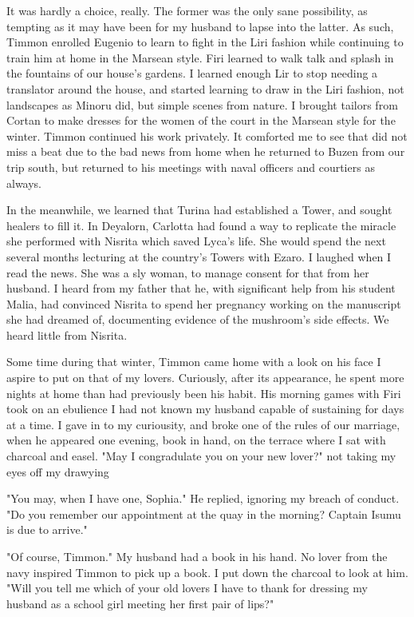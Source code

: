 \documentclass{article}
\begin{document}
It was hardly a choice, really. The former was the only sane possibility, as tempting as it may have been for my husband to lapse into the latter. As such, Timmon enrolled Eugenio to learn to fight in the Liri fashion while continuing to train him at home in the Marsean style. Firi learned to walk talk and splash in the fountains of our house's gardens. I learned enough Lir to stop needing a translator around the house, and started learning to draw in the Liri fashion, not landscapes as Minoru did, but simple scenes from nature. I brought tailors from Cortan to make dresses for the women of the court in the Marsean style for the winter. Timmon continued his work privately. It comforted me to see that did not miss a beat due to the bad news from home when he returned to Buzen from our trip south, but returned to his meetings with naval officers and courtiers as always. 

In the meanwhile, we learned that Turina had established a Tower, and sought healers to fill it. In Deyalorn, Carlotta had found a way to replicate the miracle she performed with Nisrita which saved Lyca's life. She would spend the next several months lecturing at the country's Towers with Ezaro. I laughed when I read the news. She was a sly woman, to manage consent for that from her husband. I heard from my father that he, with significant help from his student Malia, had convinced Nisrita to spend her pregnancy working on the manuscript she had dreamed of, documenting evidence of the mushroom's side effects. We heard little from Nisrita. 

Some time during that winter, Timmon came home with a look on his face I aspire to put on that of my lovers. Curiously, after its appearance, he spent more nights at home than had previously been his habit. His morning games with Firi took on an ebulience I had not known my husband capable of sustaining for days at a time. I gave in to my curiousity, and broke one of the rules of our marriage, when he appeared one evening, book in hand, on the terrace where I sat with charcoal and easel. "May I congradulate you on your new lover?" not taking my eyes off my drawying

"You may, when I have one, Sophia." He replied, ignoring my breach of conduct. "Do you remember our appointment at the quay in the morning? Captain Isumu is due to arrive." 

"Of course, Timmon." My husband had a book in his hand. No lover from the navy inspired Timmon to pick up a book. I put down the charcoal to look at him. "Will you tell me which of your old lovers I have to thank for dressing my husband as a school girl meeting her first pair of lips?"
\end{document}
